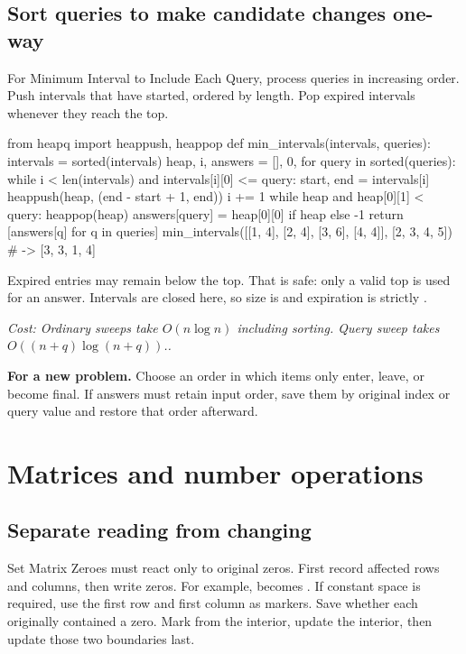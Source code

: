 \documentclass[11pt]{article}
\newcommand{\cd}[1]{{\frenchspacing\texttt{\detokenize{#1}}}}
\newcommand{\transfer}[1]{\par\textbf{For a new problem.} #1\par}
\newcommand{\cost}[1]{\par\textit{Cost: #1.}\par}
\begin{document}
\subsection{Sort queries to make candidate changes one-way}
For Minimum Interval to Include Each Query, process queries in increasing order.
Push intervals that have started, ordered by length. Pop expired intervals whenever they reach the top.
\par\noindent\begin{minipage}{\linewidth}
\hypertarget{example-start-65}{}
\begin{pyex}
from heapq import heappush, heappop
def min_intervals(intervals, queries):
    intervals = sorted(intervals)
    heap, i, answers = [], 0, {}
    for query in sorted(queries):
        while i < len(intervals) and intervals[i][0] <= query:
            start, end = intervals[i]
            heappush(heap, (end - start + 1, end))
            i += 1
        while heap and heap[0][1] < query:
            heappop(heap)
        answers[query] = heap[0][0] if heap else -1
    return [answers[q] for q in queries]
min_intervals([[1, 4], [2, 4], [3, 6], [4, 4]], [2, 3, 4, 5])
# -> [3, 3, 1, 4]
\end{pyex}
\hypertarget{example-end-65}{}
\end{minipage}\par
Expired entries may remain below the top. That is safe: only a valid top is used for an answer.
Intervals are closed here, so size is \cd{end - start + 1} and expiration is strictly \cd{end < query}.
\cost{Ordinary sweeps take \(O(n\log n)\) including sorting. Query sweep takes \(O((n+q)\log(n+q))\).}
\transfer{Choose an order in which items only enter, leave, or become final.
If answers must retain input order, save them by original index or query value and restore that order afterward.}

\section{Matrices and number operations}\label{sec:math}
\subsection{Separate reading from changing}
Set Matrix Zeroes must react only to original zeros. First record affected rows and columns, then write zeros.
For example, \cd{[[1,2],[3,0]]} becomes \cd{[[1,0],[0,0]]}.
If constant space is required, use the first row and first column as markers.
Save whether each originally contained a zero. Mark from the interior, update the interior, then update those two boundaries last.
\end{document}
